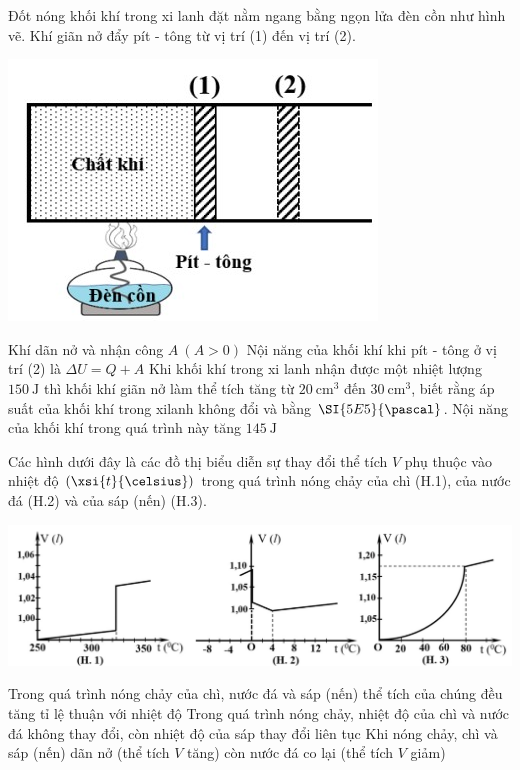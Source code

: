 \begin{ex}
	Đốt nóng khối khí trong xi lanh đặt nằm ngang bằng ngọn lửa đèn cồn như hình vẽ. Khí giãn nở đẩy pít - tông từ vị trí (1) đến vị trí (2).
	\begin{center}
		\includegraphics[width=0.3\linewidth]{../figs/D12-1-4}
	\end{center}
	{Khí dãn nở và nhận công $A\ (A>0)$}
	{\True Nội năng của khối khí khi pít - tông ở vị trí (2) là $\Delta U=Q+A$}
	{\True Khi khối khí trong xi lanh nhận được một nhiệt lượng $\SI{150}{\joule}$ thì khối khí giãn nở làm thể tích tăng từ $\SI{20}{\centi\meter^3}$ đến $\SI{30}{\centi\meter^3}$, biết rằng áp suất của khối khí trong xilanh không đổi và bằng $\SI{5E5}{\pascal}$. Nội năng của khối khí trong quá trình này tăng $\SI{145}{\joule}$}
	\loigiai{}
\end{ex}
\begin{ex}
	Các hình dưới đây là các đồ thị biểu diễn sự thay đổi thể tích $V$ phụ thuộc vào nhiệt độ $\left(\xsi{t}{\celsius}\right)$ trong quá trình nóng chảy của chì (H.1), của nước đá (H.2) và của sáp (nến) (H.3).	
	\begin{center}
		\includegraphics[width=0.9\linewidth]{../figs/D12-1-5}
	\end{center}
	{Trong quá trình nóng chảy của chì, nước đá và sáp (nến) thể tích của chúng đều tăng tỉ lệ thuận với nhiệt độ}
	{\True Trong quá trình nóng chảy, nhiệt độ của chì và nước đá không thay đổi, còn nhiệt độ của sáp thay đổi liên tục}
	{\True Khi nóng chảy, chì và sáp (nến) dãn nở (thể tích $V$ tăng) còn nước đá co lại (thể tích $V$ giảm)}
	\loigiai{}
\end{ex}
